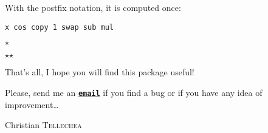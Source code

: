 \documentclass[a4paper,10pt]{article}
\newcommand\mywidth{0.85\linewidth}
\begin{document}
With the postfix notation, it is computed once:
\begin{center}
\begin{minipage}{\mywidth}
\begin{lstlisting}
x cos copy 1 swap sub mul
\end{lstlisting}
\end{minipage}
\end{center}

\bigskip
\begin{center}
$\star$\par
$\star$\quad$\star$
\end{center}
\bigskip\bigskip

That's all, I hope you will find this package useful!\par\nobreak
Please, send me an \href{mailto:unbonpetit@gmail.com}{\texttt{\textbf{email}}} if you find a bug or if you have any idea of improvement\ldots\par\nobreak\medskip
Christian \textsc{Tellechea}
\end{document}
